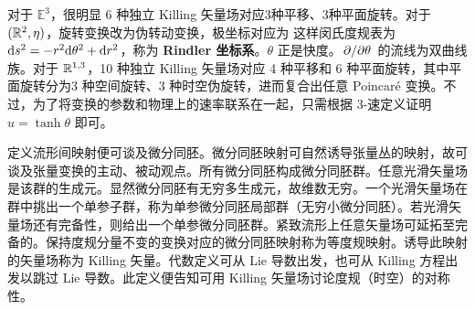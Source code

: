 对于 $\mathbb E^3$，很明显 6 种独立 Killing 矢量场对应3种平移、3种平面旋转。对于 $(\mathbb{R}^2,\eta)$，旋转变换改为伪转动变换，极坐标对应为
这样闵氏度规表为 $\dd s^2=-r^2\dd\theta^2+\dd r^2$，称为 \textbf{Rindler 坐标系}。$\theta$ 正是快度。$\pdv*{\theta}$ 的流线为双曲线族。对于 $\mathbb{R}^{1,3}$，10 种独立 Killing 矢量场对应 4 种平移和 6 种平面旋转，其中平面旋转分为3 种空间旋转、3 种时空伪旋转，进而复合出任意 Poincaré 变换。不过，为了将变换的参数和物理上的速率联系在一起，只需根据 3-速定义证明 $u=\tanh\theta$ 即可。



定义流形间映射便可谈及微分同胚。微分同胚映射可自然诱导张量丛的映射，故可谈及张量变换的主动、被动观点。所有微分同胚构成微分同胚群。任意光滑矢量场是该群的生成元。显然微分同胚有无穷多生成元，故维数无穷。一个光滑矢量场在群中挑出一个单参子群，称为单参微分同胚局部群（无穷小微分同胚）。若光滑矢量场还有完备性，则给出一个单参微分同胚群。紧致流形上任意矢量场可延拓至完备的。保持度规分量不变的变换对应的微分同胚映射称为等度规映射。诱导此映射的矢量场称为 Killing 矢量。代数定义可从 Lie 导数出发，也可从 Killing 方程出发以跳过 Lie 导数。此定义便告知可用 Killing 矢量场讨论度规（时空）的对称性。

